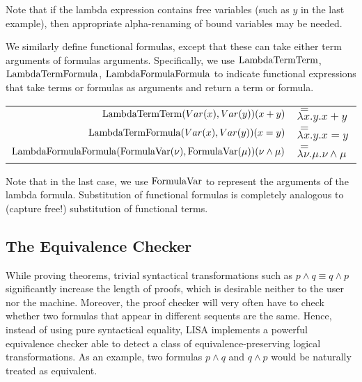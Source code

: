 Note that if the lambda expression contains free variables (such as $y$ in the last example), then appropriate alpha-renaming of bound variables may be needed.

We similarly define functional formulas, except that these can take either term arguments of formulas arguments. Specifically, we use $\operatorname{LambdaTermTerm}$, $\operatorname{LambdaTermFormula}$, $\operatorname{LambdaFormulaFormula}$ to indicate functional expressions that take terms or formulas as arguments and return a term or formula.

\begin{ex}
  \begin{center}
    \begin{tabular}{|r l|}
      \hline
      \rule{0em}{1.3em}
      $\operatorname{LambdaTermTerm}(Var(x), Var(y))(x+y)$                & $=$ $\lambda x.y. x+y$               \\
      $\operatorname{LambdaTermFormula}(Var(x), Var(y))(x=y)$                & $=$ $\lambda x.y. x=y$               \\
      $\operatorname{LambdaFormulaFormula}(\operatorname{FormulaVar}(\nu), \operatorname{FormulaVar}(\mu))(\nu \land \mu)$ & $=$ $\lambda \nu.\mu. \nu \land \mu$
      \rule[-1em]{0em}{0em} \\
      \hline
    \end{tabular}
  \end{center}

\end{ex}

Note that in the last case, we use $\operatorname{FormulaVar}$ to represent the arguments of the lambda formula. Substitution of functional formulas is completely analogous to (capture free!) substitution of functional terms.

\subsection{The Equivalence Checker}
\label{subsec:equivalencechecker}

While proving theorems, trivial syntactical transformations such as $p\land q \equiv q\land p$ significantly increase the length of proofs, which is desirable neither to the user nor the machine. Moreover, the proof checker will very often have to check whether two formulas that appear in different sequents are the same. Hence, instead of using pure syntactical equality, LISA implements a powerful equivalence checker able to detect a class of equivalence-preserving logical transformations. As an example, two formulas $p\land q$ and $q\land p$ would be naturally treated as equivalent.

